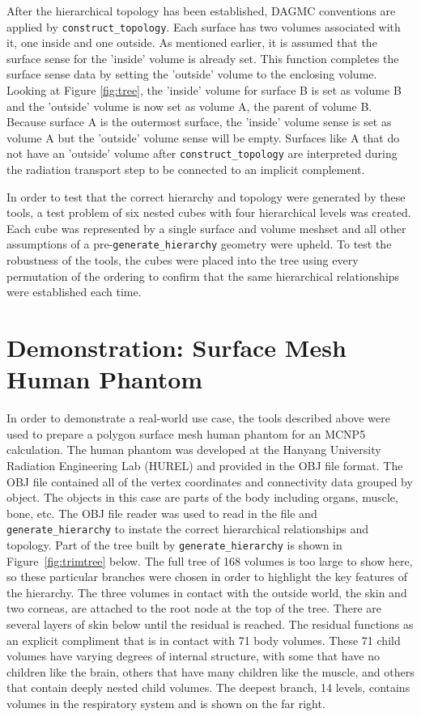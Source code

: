 \documentclass{anstrans}
\begin{document}
After the hierarchical topology has been established, DAGMC conventions are
applied by \texttt{construct\_topology}.   
Each surface has two volumes associated with it, one inside and one
outside.  As mentioned earlier, it is assumed that the surface sense for the 'inside' volume is
already set.  This function completes the surface sense data by setting the
'outside' volume to the enclosing volume.  Looking at Figure \ref{fig:tree},
the 'inside' volume for surface B is set as volume B and the 'outside' volume is
now set as volume A, the parent of volume B.  Because surface A is the
outermost surface, the 'inside' volume sense is set as volume A but the
'outside' volume sense will be empty.  Surfaces like A that do not have an 'outside' volume
after \texttt{construct\_topology} are interpreted during the radiation transport step to be connected to
an implicit complement.

In order to test that the correct hierarchy and topology were generated
by these tools, a test problem of six nested cubes with four hierarchical
levels was created.  Each cube was represented by a single surface and volume meshset and
all other assumptions of a pre-\texttt{generate\_hierarchy} geometry were
upheld.  To test the robustness of the tools, the cubes were placed
into the tree using every permutation of the ordering to confirm that the same
hierarchical relationships were established each time.

\section{Demonstration: Surface Mesh Human Phantom}

In order to demonstrate a real-world use case, the tools described above were used to
prepare a polygon surface mesh human phantom for an MCNP5 calculation.  The
human phantom was developed at the Hanyang University Radiation Engineering Lab (HUREL)
and provided in the OBJ file format.  The OBJ file contained all of the vertex coordinates
and connectivity data grouped by object.  The objects in this case are parts
of the body including organs, muscle, bone, etc.  The OBJ file reader was used
to read in the file and \texttt{generate\_hierarchy} to instate the correct
hierarchical relationships and topology.  Part of the tree built by \texttt{generate\_hierarchy}
is shown in Figure~\ref{fig:trimtree} below.  The full tree of 168 volumes is too large to
show here, so these particular branches were chosen in order to highlight the key features of the 
hierarchy.  The three volumes in contact with the outside
world, the skin and two corneas, are attached to the root node at the top of the tree.  
There are several layers of skin below until the residual is reached. The residual
functions as an explicit compliment that is in contact with 71 body volumes.
These 71 child volumes have varying degrees of internal structure, with some that have no children like the brain,
others that have many children like the muscle, and others that contain deeply nested child volumes.  The deepest branch, 14 levels,
contains volumes in the respiratory system and is shown on the far right.
\end{document}
